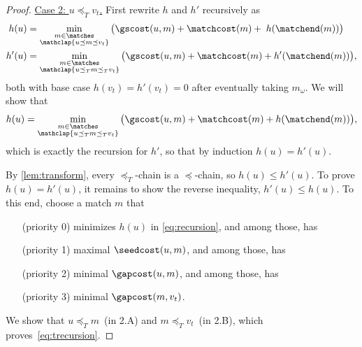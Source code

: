 \begin{proof}
  \underline{Case 2: $u\preceq_T v_t$.} First rewrite $h$ and $h'$ recursively as
  \begin{align}
    \phantom'h(u) &= \min_{\substack{m\in \matches \\ \mathclap{u\preceq m\preceq v_t}}} \big(\gscost(u, m) + \matchcost(m) + \phantom'h(\matchend(m))\big)
    \label{eq:recursion}\\
    h'(u) &= \min_{\substack{m\in \matches \\ \mathclap{u\preceq_T m\preceq_T v_t}}} \big(\gscost(u, m) + \matchcost(m) + h'(\matchend(m))\big),
    \label{eq:recursion2}
  \end{align}
  both with base case $h(v_t){=}h'(v_t)= 0$ after eventually taking $m_\omega$. We will show that
  \begin{equation}
    h(u) = \min_{\substack{m\in \matches\\\mathclap{u\preceq_T m \preceq_T v_t}}} \big(\gscost(u, m) + \matchcost(m) + h(\matchend(m))\big),
    \label{eq:trecursion}
  \end{equation}
  which is exactly the recursion for $h'$, so that by induction $h(u) = h'(u)$.

  By \cref{lem:transform}, every $\preceq_T$-chain is a $\preceq$-chain, so
  $h(u) \leq h'(u)$. To prove $h(u) {=} h'(u)$, it remains to show the reverse
  inequality, $h'(u) \leq h(u)$. To this end, choose a match $m$ that
  \vspace{-0.7em}
  \begin{itemize}[\quad (priority 0)]
    \item[(priority 0)] minimizes $h(u)$ in \cref{eq:recursion}, and among those, has
    \item[(priority 1)] maximal $\seedcost(u, m)$, and among those, has
    \item[(priority 2)] minimal $\gapcost(u, m)$, and among those, has
    \item[(priority 3)] minimal $\gapcost(m, v_t)$.
  \end{itemize}
  \vspace{-0.7em}
  We show that $u\preceq_T m$~(in 2.A) and $m\preceq_T v_t$~(in 2.B), which
  proves~\cref{eq:trecursion}.


\end{proof}
